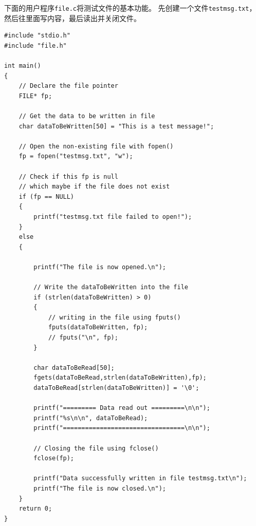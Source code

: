 \documentclass[logo,reportComp]{thesis}
\begin{document}
下面的用户程序\verb'file.c'将测试文件的基本功能。
先创建一个文件\verb'testmsg.txt'，然后往里面写内容，最后读出并关闭文件。
\begin{lstlisting}
#include "stdio.h"
#include "file.h"

int main()
{
    // Declare the file pointer 
    FILE* fp;

    // Get the data to be written in file 
    char dataToBeWritten[50] = "This is a test message!"; 
  
    // Open the non-existing file with fopen()
    fp = fopen("testmsg.txt", "w");

    // Check if this fp is null 
    // which maybe if the file does not exist 
    if (fp == NULL)
    {
        printf("testmsg.txt file failed to open!"); 
    }
    else
    {

        printf("The file is now opened.\n");

        // Write the dataToBeWritten into the file 
        if (strlen(dataToBeWritten) > 0) 
        {
            // writing in the file using fputs()
            fputs(dataToBeWritten, fp);
            // fputs("\n", fp);
        }

        char dataToBeRead[50];
        fgets(dataToBeRead,strlen(dataToBeWritten),fp);
        dataToBeRead[strlen(dataToBeWritten)] = '\0';

        printf("========= Data read out =========\n\n");
        printf("%s\n\n", dataToBeRead);
        printf("=================================\n\n");

        // Closing the file using fclose()
        fclose(fp);

        printf("Data successfully written in file testmsg.txt\n"); 
        printf("The file is now closed.\n");
    }
    return 0;
}
\end{lstlisting}
\end{document}
